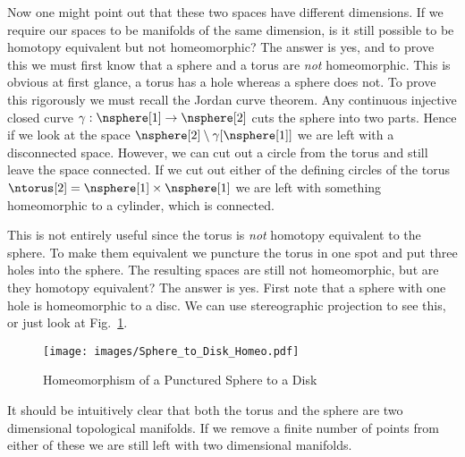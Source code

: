 \documentclass{book}                                                           %
\begin{document}
                Now one might point out that these two spaces have different
                dimensions. If we require our spaces to be manifolds of the
                same dimension, is it still possible to be homotopy equivalent
                but not homeomorphic? The answer is yes, and to prove this we
                must first know that a sphere and a torus are \textit{not}
                homeomorphic. This is obvious at first glance, a torus has a
                hole whereas a sphere does not. To prove this rigorously we
                must recall the Jordan curve theorem. Any continuous injective
                closed curve $\gamma:\nsphere[1]\rightarrow\nsphere[2]$ cuts the
                sphere into two parts. Hence if we look at the space
                $\nsphere[2]\setminus\gamma[\nsphere[1]]$ we are left with a
                disconnected space. However, we can cut out a circle from the
                torus and still leave the space connected. If we cut out either
                of the defining circles of the torus
                $\ntorus[2]=\nsphere[1]\times\nsphere[1]$ we are left with
                something homeomorphic to a cylinder, which is connected.
                \par\hfill\par
                This is not entirely useful since the torus is \textit{not}
                homotopy equivalent to the sphere. To make them equivalent we
                puncture the torus in one spot and put three holes into the
                sphere. The resulting spaces are still not homeomorphic, but
                are they homotopy equivalent? The answer is yes. First note that
                a sphere with one hole is homeomorphic to a disc. We can use
                stereographic projection to see this, or just look at
                Fig.~\ref{fig:homeo_Punc_S2_and_Plane}.
                \begin{figure}[H]
                    \centering
                    \captionsetup{type=figure}
                    \texttt{[image: images/Sphere\_to\_Disk\_Homeo.pdf]}
                    \caption{Homeomorphism of a Punctured Sphere to a Disk}
                    \label{fig:homeo_Punc_S2_and_Plane}
                \end{figure}
                It should be intuitively clear that both the torus and the
                sphere are two dimensional topological manifolds. If we remove a
                finite number of points from either of these we are still left
                with two dimensional manifolds.
\end{document}
